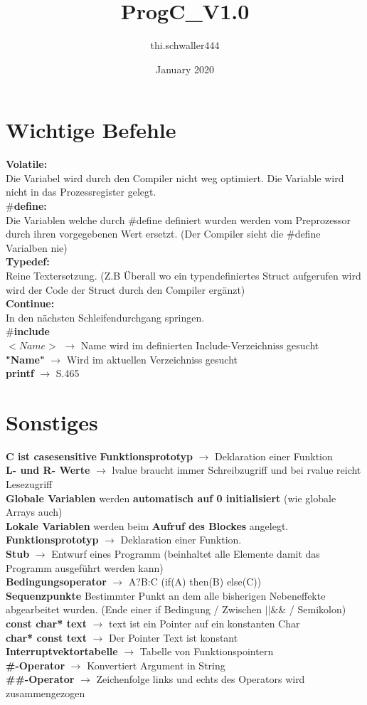 \documentclass{article}
\title{ProgC_V1.0}
\author{thi.schwaller444 }
\date{January 2020}
\begin{document}
\section{Wichtige Befehle}
\textbf{Volatile:} \\
Die Variabel wird durch den Compiler nicht weg optimiert. Die Variable wird nicht in das Prozessregister gelegt.\\
\textbf{$\#$define:} \\
Die Variablen welche durch $\#$define definiert wurden werden vom Preprozessor durch ihren vorgegebenen Wert ersetzt. (Der Compiler sieht die $\#$define Varialben nie) \\
\textbf{Typedef:} \\
Reine Textersetzung. (Z.B Überall wo ein typendefiniertes Struct aufgerufen wird wird der Code der Struct durch den Compiler ergänzt) \\
\textbf{Continue:} \\
In den nächsten Schleifendurchgang springen. \\
\textbf{$\#$include}\\
\textbf{$<Name>$} $\rightarrow$ Name wird im definierten Include-Verzeichniss gesucht \\
\textbf{"Name"} $\rightarrow$ Wird im aktuellen Verzeichniss gesucht \\
\textbf{printf} $\rightarrow$ S.465
\section{Sonstiges}
\textbf{C ist casesensitive}
\textbf{Funktionsprototyp} $\rightarrow$ Deklaration einer Funktion \\
\textbf{L- und R- Werte}  $\rightarrow$ lvalue braucht immer Schreibzugriff und bei rvalue reicht Lesezugriff \\
\textbf{Globale Variablen} werden \textbf{automatisch auf 0 initialisiert} (wie globale Arrays auch) \\
\textbf{Lokale Variablen} werden beim \textbf{Aufruf des Blockes} angelegt. \\
\textbf{Funktionsprototyp} $\rightarrow$ Deklaration einer Funktion. \\
\textbf{Stub} $\rightarrow$ Entwurf eines Programm (beinhaltet alle Elemente damit das Programm ausgeführt werden kann) \\
\textbf{Bedingungsoperator} $\rightarrow$ A?B:C (if(A) then(B) else(C)) \\
\textbf{Sequenzpunkte} Bestimmter Punkt an dem alle bisherigen Nebeneffekte abgearbeitet wurden. (Ende einer if Bedingung / Zwischen $|| \&\&$ / Semikolon)\\
\textbf{const char* text} $\rightarrow$ text ist ein Pointer auf ein konstanten Char \\
\textbf{char* const text} $\rightarrow$ Der Pointer Text ist konstant\\
\textbf{Interruptvektortabelle} $\rightarrow$ Tabelle von Funktionspointern\\
\textbf{\#-Operator} $\rightarrow$ Konvertiert Argument in String \\
\textbf{\#\#-Operator} $\rightarrow$ Zeichenfolge links und echts des Operators wird zusammengezogen
\end{document}
